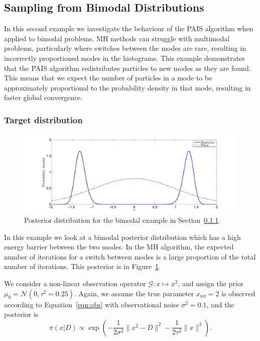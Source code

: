 \documentclass[final]{siamltex}
\newcommand{\G}{\mathcal{G}}
\newcommand{\N}{\mathcal{N}}
\begin{document}

\subsection{Sampling from Bimodal Distributions}
\label{sec:bimodal}

In this second example we investigate the behaviour of the PAIS
algorithm when applied to bimodal problems. MH methods can struggle
with multimodal problems, particularly where switches between the
modes are rare, resulting in incorrectly proportioned modes in the
histograms. This example demonstrates that the PAIS algorithm
redistributes particles to new modes as they are found. This means
that we expect the number of particles in a mode to be approximately
proportional to the probability density in that mode, resulting in
faster global convergence.


\subsubsection{Target distribution} \label{sec:tar}

\begin{figure}[htpb]
\begin{center}
\includegraphics[width=\textwidth]{"figures/BM2_posterior"}
\caption{Posterior distribution for the bimodal example in
Section~\ref{sec:tar}.}
\label{fig:BM2_posterior}
\end{center}
\end{figure}

In this example we look at a bimodal posterior distribution which has
a high energy barrier between the two modes. In the MH algorithm, the
expected number of iterations for a switch between modes is a large
proportion of the total number of iterations. This posterior is in
Figure~\ref{fig:BM2_posterior}.

We consider a non-linear observation operator $\G\colon x \mapsto
x^2$, and assign the prior $\mu_0 = \N(0, \tau^2=0.25)$. Again, we
assume the true parameter $x_\text{ref}=2$ is observed according to
Equation~\eqref{eqn:obs} with observational noise $\sigma^2 = 0.1$,
and the posterior is
\[
	\pi(x|D) \propto \exp\left(-\frac{1}{2\sigma^2}\|x^2 - D\|^2
		 - \frac{1}{2\tau^2}\|x\|^2\right).
\]
\end{document}
